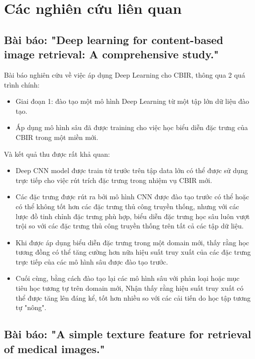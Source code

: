 \documentclass[a4paper,14pt]{extreport}
\begin{document}
\section{Các nghiên cứu liên quan}
\subsection{Bài báo: "Deep learning for content-based image retrieval: A comprehensive study." \cite{paper-1}}

Bài báo nghiên cứu về việc áp dụng Deep Learning cho CBIR, thông qua 2 quá trình chính: 

\begin{itemize}
        \item Giai đoạn 1: đào tạo một mô hình Deep Learning từ một tập lớn dữ liệu đào tạo.
        \item Áp dụng mô hình sâu đã được training cho việc học biểu diễn đặc trưng của CBIR trong một miền mới.
\end{itemize}

Và kết quả thu được rất khả quan:

\begin{itemize}
        \item Deep CNN model được train từ trước trên tập data lớn có thể được sử dụng trực tiếp cho việc rút trích đặc trưng trong nhiệm vụ CBIR mới.
        \item Các đặc trưng được rút ra bởi mô hình CNN được đào tạo trước có thể hoặc có thể không tốt hơn các đặc trưng thủ công truyền thống, nhưng với các lược đồ tinh chỉnh đặc trưng phù hợp, biểu diễn đặc trưng học sâu luôn vượt trội so với các đặc trưng thủ công truyền thống trên tất cả các tập dữ liệu.
        \item Khi được áp dụng biểu diễn đặc trưng trong một domain mới, thấy rằng học tương đồng có thể tăng cường hơn nữa hiệu suất truy xuất của các đặc trưng trực tiếp của các mô hình sâu được đào tạo trước.
        \item Cuối cùng, bằng cách đào tạo lại các mô hình sâu với phân loại hoặc mục tiêu học tương tự trên domain mới, Nhận thấy rằng hiệu suất truy xuất có thể được tăng lên đáng kể, tốt hơn nhiều so với các cải tiến do học tập tương tự "nông".

\end{itemize}

\subsection{Bài báo: "A simple texture feature for retrieval of medical images." \cite{paper-2}}
\end{document}
